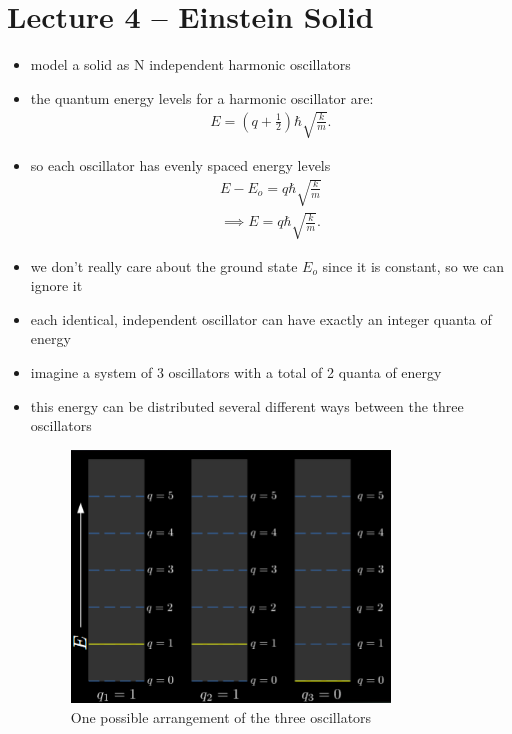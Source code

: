 \documentclass[10pt]{article}
\begin{document}
\section{Lecture 4 -- Einstein Solid}
\begin{itemize}
    \item model a solid as N independent harmonic oscillators
    \item the quantum energy levels for a harmonic oscillator are:
        \begin{align*}
            E = \left( q + \frac{1}{2} \right) \hbar \sqrt{\frac{k}{m}}  
        .\end{align*}
    \item so each oscillator has evenly spaced energy levels
        \begin{align*}
            E - E_o = q \hbar \sqrt{\frac{k}{m}} \\ 
            \implies E = q \hbar \sqrt{\frac{k}{m}} 
        .\end{align*}
    \item we don't really care about the ground state $E_o$ since it is constant, so we can ignore it
    \item each identical, independent oscillator can have exactly an integer quanta of energy
    \item imagine a system of 3 oscillators with a total of 2 quanta of energy 
    \item this energy can be distributed several different ways between the three oscillators
        \begin{figure}[h!]
            \centering
            \includegraphics[width=0.8\textwidth]{quantumOscillatorArrangement}
            \caption{One possible arrangement of the three oscillators}

\end{figure}
\end{itemize}
\end{document}

